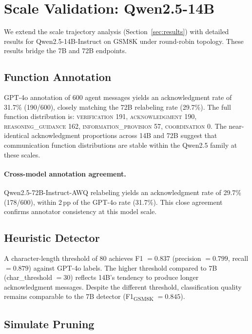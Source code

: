 \section{Scale Validation: Qwen2.5-14B}
\label{app:scaling}

We extend the scale trajectory analysis (Section~\ref{sec:results}) with detailed results for Qwen2.5-14B-Instruct on GSM8K under round-robin topology. These results bridge the 7B and 72B endpoints.

\subsection{Function Annotation}

GPT-4o annotation of 600 agent messages yields an acknowledgment rate of 31.7\% (190/600), closely matching the 72B relabeling rate (29.7\%). The full function distribution is: \textsc{verification} 191, \textsc{acknowledgment} 190, \textsc{reasoning\_guidance} 162, \textsc{information\_provision} 57, \textsc{coordination} 0. The near-identical acknowledgment proportions across 14B and 72B suggest that communication function distributions are stable within the Qwen2.5 family at these scales.

\paragraph{Cross-model annotation agreement.} Qwen2.5-72B-Instruct-AWQ relabeling yields an acknowledgment rate of 29.7\% (178/600), within 2\,pp of the GPT-4o rate (31.7\%). This close agreement confirms annotator consistency at this model scale.

\subsection{Heuristic Detector}

A character-length threshold of 80 achieves F1 $= 0.837$ (precision $= 0.799$, recall $= 0.879$) against GPT-4o labels. The higher threshold compared to 7B (char\_threshold $= 30$) reflects 14B's tendency to produce longer acknowledgment messages. Despite the different threshold, classification quality remains comparable to the 7B detector (F1\textsubscript{GSM8K} $= 0.845$).

\subsection{Simulate Pruning}

